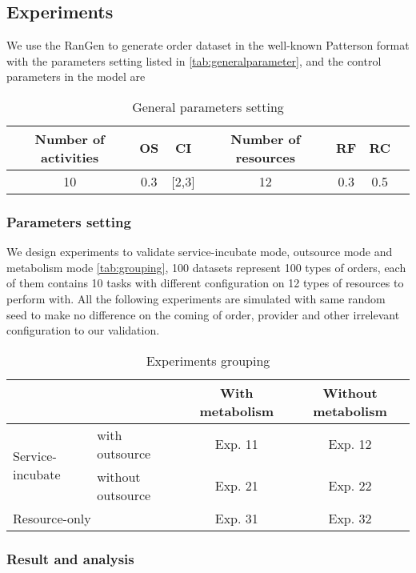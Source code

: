 \subsection{Experiments} %
\label{ssub:case_design}
We use the RanGen\cite{Demeulemeester2003} to generate order dataset in the well-known Patterson format with the parameters setting listed in \autoref{tab:generalparameter}, and the control parameters in the model are

\begin{table}[htbp]
  \centering
  \scriptsize
	\caption{General parameters setting}
    \begin{tabular}{ccccccc}
    \toprule
    Number of activities & OS & CI & Number of resources & RF & RC \\
    \midrule
     10  &   0.3    &  [2,3]     &   12     &  0.3     &   0.5     \\
    \bottomrule
    \end{tabular}%
    {}
  \label{tab:generalparameter}%
\end{table}%



\subsubsection{Parameters setting} %
\label{ssub:parameters_setting}
We design experiments to validate service-incubate mode, outsource mode and metabolism mode \autoref{tab:grouping}, 100 datasets represent 100 types of orders, each of them contains 10 tasks with different configuration on 12 types of resources to perform with. 
All the following experiments are simulated with same random seed to make no difference on the coming of order, provider and other irrelevant configuration to our validation. 



\begin{table}[htbp]
  \centering
  \scriptsize
  \caption{Experiments grouping}
    \begin{tabular}{llcc}
    \toprule
          &       & With metabolism & Without metabolism \\
    \midrule
    \multicolumn{1}{l}{\multirow{2}[0]{*}{Service-incubate}} & with outsource & Exp. 11 &Exp. 12 \\\cline{2-4}
    \multicolumn{1}{l}{} & without outsource & Exp. 21 & Exp. 22 \\\hline
    \multicolumn{2}{l}{Resource-only} & Exp. 31 & Exp. 32 \\
    \bottomrule
    \end{tabular}%
  \label{tab:grouping}%
\end{table}%

\subsubsection{Result and analysis} %
\label{ssub:result_and_analysis}

